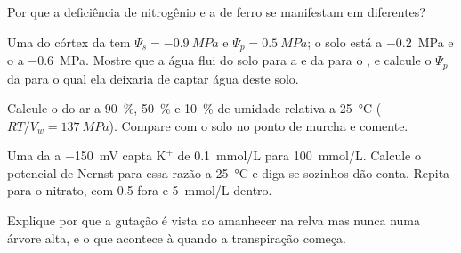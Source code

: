 \begin{exercise}[$\star$]\label{exo:b1:plant-water-minerals:4}
Por que a deficiência de nitrogênio e a de ferro se manifestam em
 diferentes?
\end{exercise}

\begin{exercise}[$\star\star$]\label{exo:b1:plant-water-minerals:5}
Uma  do córtex da  tem $\Psi_s = \qty{-0.9}{MPa}$ e $\Psi_p =
\qty{0.5}{MPa}$; o solo está a \qty{-0.2}{MPa} e o  a
\qty{-0.6}{MPa}. Mostre que a água flui do solo para a  e da
 para o , e calcule o $\Psi_p$ da  para o qual ela
deixaria de captar água deste solo.
\end{exercise}

\begin{exercise}[$\star\star$]\label{exo:b1:plant-water-minerals:6}
Calcule o  do ar a \qty{90}{\%}, \qty{50}{\%} e
\qty{10}{\%} de umidade relativa a \qty{25}{\celsius} ($RT/V_w =
\qty{137}{MPa}$). Compare com o solo no ponto de murcha e comente.
\end{exercise}

\begin{exercise}[$\star\star$]\label{exo:b1:plant-water-minerals:7}
Uma  da  a \qty{-150}{mV} capta $\mathrm{K^+}$ de
\qty{0.1}{mmol/L} para \qty{100}{mmol/L}. Calcule o potencial de
Nernst para essa razão a \qty{25}{\celsius} e diga se  sozinhos
dão conta. Repita para o nitrato, com \qty{0.5}{} fora e
\qty{5}{mmol/L} dentro.
\end{exercise}

\begin{exercise}[$\star\star$]\label{exo:b1:plant-water-minerals:8}
Explique por que a gutação é vista ao amanhecer na relva mas nunca
numa árvore alta, e o que acontece à  quando a
transpiração começa.
\end{exercise}


